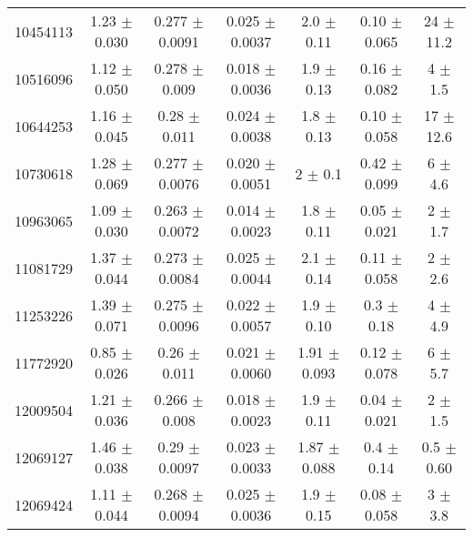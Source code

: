 \begin{table*}
\begin{tabular}{c|cccccc}
10454113 &        1.23   $\pm$  0.030    &        0.277  $\pm$  0.0091   &        0.025  $\pm$  0.0037   &        2.0    $\pm$  0.11     &        0.10   $\pm$  0.065    &       24      $\pm$  11.2     \\
10516096 &        1.12   $\pm$  0.050    &        0.278  $\pm$  0.009    &        0.018  $\pm$  0.0036   &        1.9    $\pm$  0.13     &        0.16   $\pm$  0.082    &        4      $\pm$  1.5      \\
10644253 &        1.16   $\pm$  0.045    &        0.28   $\pm$  0.011    &        0.024  $\pm$  0.0038   &        1.8    $\pm$  0.13     &        0.10   $\pm$  0.058    &       17      $\pm$  12.6     \\
10730618 &        1.28   $\pm$  0.069    &        0.277  $\pm$  0.0076   &        0.020  $\pm$  0.0051   &        2      $\pm$  0.1      &        0.42   $\pm$  0.099    &        6      $\pm$  4.6      \\
10963065 &        1.09   $\pm$  0.030    &        0.263  $\pm$  0.0072   &        0.014  $\pm$  0.0023   &        1.8    $\pm$  0.11     &        0.05   $\pm$  0.021    &        2      $\pm$  1.7      \\
11081729 &        1.37   $\pm$  0.044    &        0.273  $\pm$  0.0084   &        0.025  $\pm$  0.0044   &        2.1    $\pm$  0.14     &        0.11   $\pm$  0.058    &        2      $\pm$  2.6      \\
11253226 &        1.39   $\pm$  0.071    &        0.275  $\pm$  0.0096   &        0.022  $\pm$  0.0057   &        1.9    $\pm$  0.10     &        0.3    $\pm$  0.18     &        4      $\pm$  4.9      \\
11772920 &        0.85   $\pm$  0.026    &        0.26   $\pm$  0.011    &        0.021  $\pm$  0.0060   &        1.91   $\pm$  0.093    &        0.12   $\pm$  0.078    &        6      $\pm$  5.7      \\
12009504 &        1.21   $\pm$  0.036    &        0.266  $\pm$  0.008    &        0.018  $\pm$  0.0023   &        1.9    $\pm$  0.11     &        0.04   $\pm$  0.021    &        2      $\pm$  1.5      \\
12069127 &        1.46   $\pm$  0.038    &        0.29   $\pm$  0.0097   &        0.023  $\pm$  0.0033   &        1.87   $\pm$  0.088    &        0.4    $\pm$  0.14     &        0.5    $\pm$  0.60     \\
12069424 &        1.11   $\pm$  0.044    &        0.268  $\pm$  0.0094   &        0.025  $\pm$  0.0036   &        1.9    $\pm$  0.15     &        0.08   $\pm$  0.058    &        3      $\pm$  3.8      \\

\end{tabular}
\end{table*}
